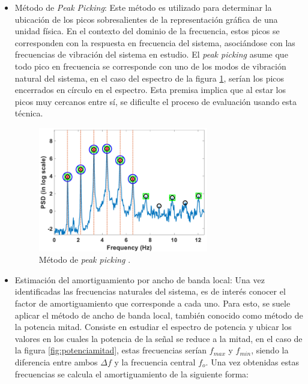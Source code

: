 \begin{itemize}
    \item Método de \textit{Peak Picking}: Este método es utilizado para determinar la ubicación de los picos sobresalientes de la representación gráfica de una unidad física. En el contexto del dominio de la frecuencia, estos picos se corresponden con la respuesta en frecuencia del sistema, asociándose con las frecuencias de vibración del sistema en estudio. El \textit{peak picking} asume que todo pico en frecuencia se corresponde con uno de los modos de vibración natural del sistema, en el caso del espectro de la figura \ref{fig:peakpicking}, serían los picos encerrados en círculo en el espectro. Esta premisa implica que al estar los picos muy cercanos entre sí, se dificulte el proceso de evaluación usando esta técnica.
    
    \begin{figure}[H]
        \centering
        \includegraphics[width = 0.7\textwidth]{imagenes/cap1_marcoteo/peakpicking.png}
        \caption{Método de \textit{peak picking} \citep{peakpicking2021}.}
        \label{fig:peakpicking}
    \end{figure}
    
    \item Estimación del amortiguamiento por ancho de banda local: Una vez identificadas las frecuencias naturales del sistema, es de interés conocer el factor de amortiguamiento que corresponde a cada uno. Para esto, se suele aplicar el método de ancho de banda local, también conocido como método de la potencia mitad. Consiste en estudiar el espectro de potencia y ubicar los valores en los cuales la potencia de la señal se reduce a la mitad, en el caso de la figura \ref{fig:potenciamitad}, estas frecuencias serían $f_{max}$ y $f_{min}$, siendo la diferencia entre ambos $\Delta f$ y la frecuencia central $f_o$. Una vez obtenidas estas frecuencias se calcula el amortiguamiento de la siguiente forma:
    

\end{itemize}
